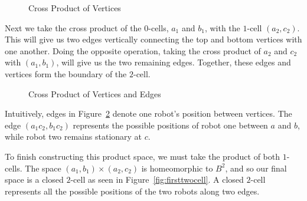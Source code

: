 \documentclass{amsart}
\begin{document}
\begin{figure}[h]
\caption{Cross Product of Vertices}\label{fig:vertexcross}
\centering
{}
\end{figure}

Next we take the cross product of the $0$-cells, $a_1$ and $b_1$, with the $1$-cell $(a_2,c_2)$. This will give us two edges vertically connecting the top and bottom vertices with one another. Doing the opposite operation, taking the cross product of $a_2$ and $c_2$ with $(a_1, b_1)$, will give us the two remaining edges. Together, these edges and vertices form the boundary of the $2$-cell.

\begin{figure}[h]
\caption{Cross Product of Vertices and Edges}\label{fig:crosswithedges}
\centering
{}
\hspace{.5in}
\end{figure}

Intuitively, edges in Figure~\ref{fig:crosswithedges} denote one robot's position between vertices. The edge $(a_1c_2, b_1c_2)$ represents the possible positions of robot one between $a$ and $b$, while robot two remains stationary at $c$.

To finish constructing this product space, we must take the product of both $1$-cells. The space $(a_1,b_1)\times (a_2, c_2)$ is homeomorphic to $B^2$, and so our final space is a closed $2$-cell as seen in Figure~\ref{fig:firsttwocell}. A closed $2$-cell represents all the possible positions of the two robots along two edges. 
 
\end{document}
